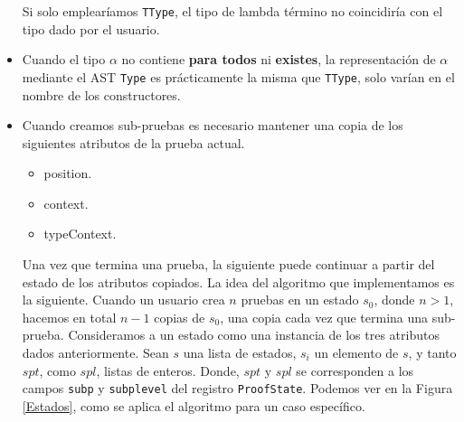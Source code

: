 \documentclass[a4paper,11pt]{article}
\begin{document}
\begin{itemize}
  Si solo emplearíamos \texttt{TType}, el tipo de lambda término no coincidiría con el tipo dado por el usuario.
  
  \item Cuando el tipo $\alpha$ no contiene \textbf{para todos} ni \textbf{existes}, la representación de $\alpha$ mediante el AST \texttt{Type} es 
  prácticamente la misma que \texttt{TType}, solo varían en el nombre de los constructores.
  
  \item Cuando creamos sub-pruebas es necesario mantener una copia de los siguientes atributos de la prueba actual.
  \begin{itemize}
    \item position.
    \item context.
    \item typeContext.
  \end{itemize}
   Una vez que termina una prueba, la siguiente puede continuar a partir del estado de los atributos copiados.
   La idea del algoritmo que implementamos es la siguiente. Cuando un usuario crea $n$ pruebas en un estado $s_{0}$, donde $n > 1$, hacemos en total $n-1$ copias 
   de $s_{0}$, una copia cada vez que termina una sub-prueba. Consideramos a un estado como una instancia de los tres atributos dados anteriormente.
   Sean $s$ una lista de estados, $s_{i}$ un elemento de $s$, y tanto $spt$, como $spl$, listas de enteros. Donde, $spt$ y $spl$ se corresponden a los campos 
   \texttt{subp} y \texttt{subplevel} del registro \texttt{ProofState}.
   Podemos ver en la Figura \ref{Estados}, como se aplica el algoritmo para un caso específico. 
   

\end{itemize}
\end{document}
